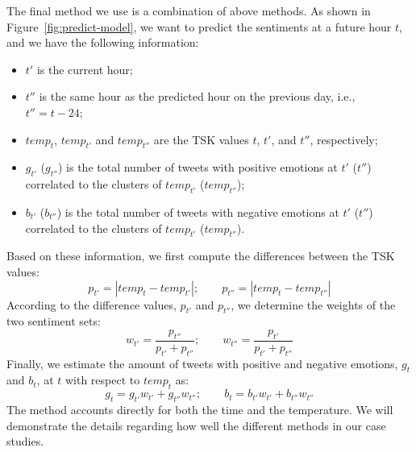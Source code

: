 The final method we use is a combination of above methods. As shown in Figure~\ref{fig:predict-model}, we want to predict the sentiments at a future hour $t$, and we have the following information:
%
\begin{itemize}
\vspace{-.1in}
\setlength{\topsep}{-0.1in}
\setlength{\itemsep}{-0.05in}
\item $t'$ is the current hour;
\item $t''$ is the same hour as the predicted hour on the previous day, i.e., $t'' = t - 24$;
\item $temp_t$, $temp_{t'}$ and $temp_{t''}$ are the TSK values $t$, $t'$, and $t''$, respectively;
\item $g_{t'}$ ($g_{t''}$) is the total number of tweets with positive emotions at $t'$ ($t''$) correlated to the clusters of $temp_{t'}$ ($temp_{t''}$);
\item $b_{t'}$ ($b_{t''}$) is the total number of tweets with negative emotions at $t'$ ($t''$) correlated to the clusters of $temp_{t'}$ ($temp_{t''}$).
\end{itemize}
\vspace{-0.05in}
%
Based on these information, we first compute the differences between the TSK values:
%
\begin{equation} 
\label{eq:p} 
p_{t'}=\left | temp_t - temp_{t'} \right |;	\qquad p_{t''}=\left | temp_t - temp_{t''} \right |	 
\end{equation}
%
According to the difference values, $p_{t'}$ and $p_{t''}$, we determine the weights of the two sentiment sets:
%
\begin{equation} 
\label{eq:w} 
w_{t'}=\frac{p_{t''}}{p_{t'} + p_{t''}}; 	\qquad w_{t''}=\frac{p_{t'}}{p_{t'} + p_{t''}}   
\end{equation}
%
Finally, we estimate the amount of tweets with positive and negative emotions, $g_t$ and $b_t$, at $t$ with respect to $temp_t$ as:
%
\begin{equation} 
\label{eq:gb}  
g_t = g_{t'}w_{t'} + g_{t''}w_{t''};	\qquad b_t = b_{t'}w_{t'} + b_{t''}w_{t''}	 
\end{equation}
%
The method accounts directly for both the time and the temperature. We will demonstrate the details regarding how well the different methods in our case studies.
 
